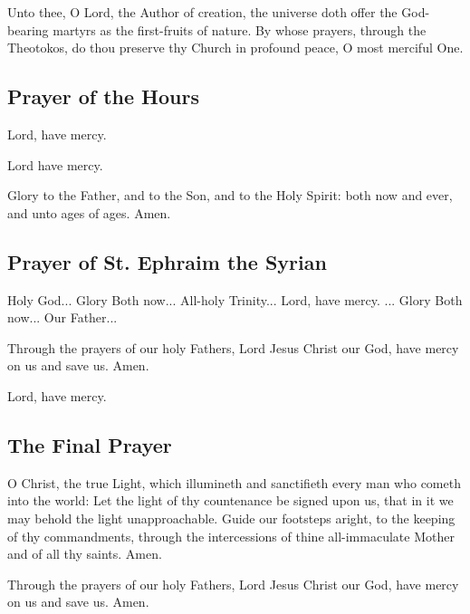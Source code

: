  Unto thee, O Lord, the Author of creation, the universe doth offer the God-bearing martyrs as the first-fruits of nature. By whose prayers, through the Theotokos, do thou preserve thy Church in profound peace, O most merciful One.


\subsection{Prayer of the Hours}

Lord, have mercy. 



Lord have mercy. 

Glory to the Father, and to the Son, and to the Holy Spirit: both now and ever, and unto ages of ages. Amen.



\subsection{Prayer of St. Ephraim the Syrian}




Holy God... Glory  Both now... All-holy Trinity... Lord, have mercy. ... Glory  Both now... Our Father...

Through the prayers of our holy Fathers, Lord Jesus Christ our God, have mercy on us and save us. Amen.

Lord, have mercy. 

\subsection{The Final Prayer}

O Christ, the true Light, which illumineth and sanctifieth every man who cometh into the world: Let the light of thy countenance be signed upon us, that in it we may behold the light unapproachable. Guide our footsteps aright, to the keeping of thy commandments, through the intercessions of thine all-immaculate Mother and of all thy saints. Amen.

Through the prayers of our holy Fathers, Lord Jesus Christ our God, have mercy on us and save us. Amen.

\cleardoublepage
